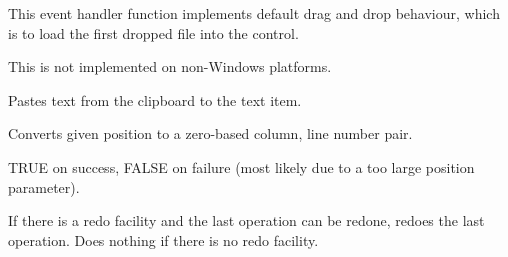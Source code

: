 This event handler function implements default drag and drop behaviour, which
is to load the first dropped file into the control.




This is not implemented on non-Windows platforms.



\label{wxtextctrlpaste}


Pastes text from the clipboard to the text item.

\label{wxtextctrlpositiontoxy}


Converts given position to a zero-based column, line number pair.






TRUE on success, FALSE on failure (most likely due to a too large position
parameter).




\label{wxtextctrlredo}


If there is a redo facility and the last operation can be redone, redoes the last operation. Does nothing
if there is no redo facility.

\label{wxtextctrlremove}


